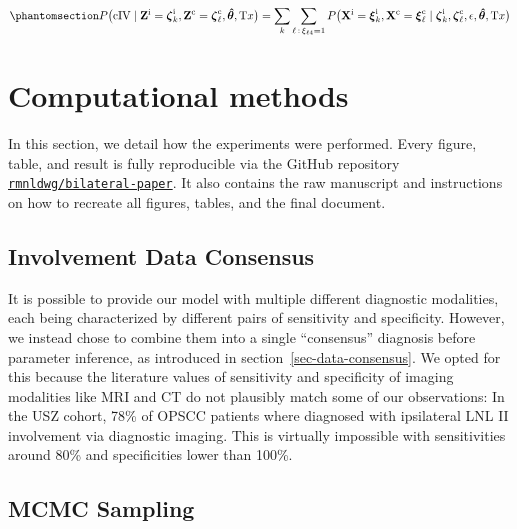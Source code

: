 \documentclass[
  sn-mathphys-num,
]{sn-jnl}
\begin{document}
\begin{equation}\phantomsection\label{eq-marg-over-posterior}{
P \big( \text{cIV} \mid \mathbf{Z}^\text{i}=\boldsymbol{\zeta}^\text{i}_k, \mathbf{Z}^\text{c}=\boldsymbol{\zeta}^\text{c}_\ell, \boldsymbol{\hat{\theta}}, \text{T}x \big) = \sum_k \sum_{\ell \, : \, \xi_{\ell 4}=1} P \big( \mathbf{X}^\text{i} = \boldsymbol{\xi}^\text{i}_k, \mathbf{X}^\text{c} = \boldsymbol{\xi}^\text{c}_\ell \mid \boldsymbol{\zeta}^\text{i}_k, \boldsymbol{\zeta}^\text{c}_\ell, \epsilon, \boldsymbol{\hat{\theta}}, \text{T}x \big)
}\end{equation}

\section{Computational methods}\label{sec-methods}

In this section, we detail how the experiments were performed. Every
figure, table, and result is fully reproducible via the GitHub
repository
\href{https://github.com/rmnldwg/bilateral-paper}{\texttt{rmnldwg/bilateral-paper}}.
It also contains the raw manuscript and instructions on how to recreate
all figures, tables, and the final document.

\subsection{Involvement Data
Consensus}\label{involvement-data-consensus}

It is possible to provide our model with multiple different diagnostic
modalities, each being characterized by different pairs of sensitivity
and specificity. However, we instead chose to combine them into a single
``consensus'' diagnosis before parameter inference, as introduced in
section~\ref{sec-data-consensus}. We opted for this because the
literature values of sensitivity and specificity
\citep{de_bondt_detection_2007, kyzas_18f-fluorodeoxyglucose_2008} of
imaging modalities like MRI and CT do not plausibly match some of our
observations: In the USZ cohort, 78\% of OPSCC patients where diagnosed
with ipsilateral LNL II involvement via diagnostic imaging. This is
virtually impossible with sensitivities around 80\% and specificities
lower than 100\%.

\subsection{MCMC Sampling}\label{sec-sampling}
\end{document}
